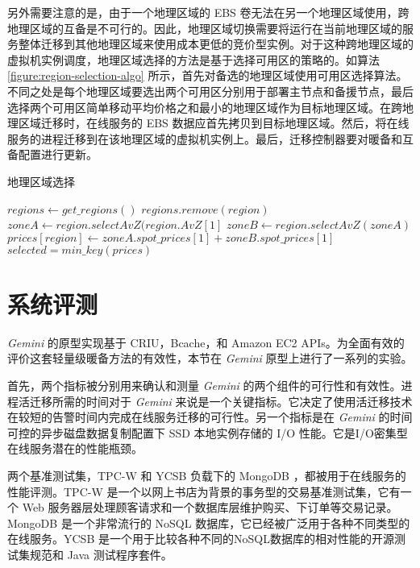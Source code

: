 另外需要注意的是，由于一个地理区域的 EBS 卷无法在另一个地理区域使用，跨地理区域的互备是不可行的。因此，地理区域切换需要将运行在当前地理区域的服务整体迁移到其他地理区域来使用成本更低的竞价型实例。对于这种跨地理区域的虚拟机实例调度，地理区域选择的方法是基于选择可用区的策略的。如算法 \ref{figure:region-selection-algo} 所示，首先对备选的地理区域使用可用区选择算法。不同之处是每个地理区域要选出两个可用区分别用于部署主节点和备援节点，最后选择两个可用区简单移动平均价格之和最小的地理区域作为目标地理区域。在跨地理区域迁移时，在线服务的 EBS 数据应首先拷贝到目标地理区域。然后，将在线服务的进程迁移到在该地理区域的虚拟机实例上。最后，迁移控制器要对暖备和互备配置进行更新。

\begin{algorithm}
\caption{地理区域选择}
\label{figure:region-selection-algo}

$regions\gets get\_regions()$
{
  {
    $regions.remove(region)$\;
  }
}
{
  $zoneA\gets region.selectAvZ(region.AvZ[1]$
  $zoneB\gets region.selectAvZ(zoneA)$
  $prices[region]\gets zoneA.spot\_prices[1] + zoneB.spot\_prices[1]$\;
}
$selected = min\_key(prices)$\;
\end{algorithm}

\section{系统评测}
\emph{Gemini} 的原型实现基于 CRIU，Bcache，和 Amazon EC2 APIs。为全面有效的评价这套轻量级暖备方法的有效性，本节在 \emph{Gemini} 原型上进行了一系列的实验。

首先，两个指标被分别用来确认和测量 \emph{Gemini} 的两个组件的可行性和有效性。进程活迁移所需的时间对于 \emph{Gemini} 来说是一个关键指标。它决定了使用活迁移技术在较短的告警时间内完成在线服务迁移的可行性。另一个指标是在 \emph{Gemini} 的时间可控的异步磁盘数据复制配置下 SSD 本地实例存储的 I/O 性能。它是I/O密集型在线服务潜在的性能瓶颈。

两个基准测试集，TPC-W \cite{TPCW:2014} 和 YCSB \cite{YCSB:2014} 负载下的 MongoDB \cite{Mongodb:2014}，都被用于在线服务的性能评测。TPC-W 是一个以网上书店为背景的事务型的交易基准测试集，它有一个 Web 服务器层处理顾客请求和一个数据库层维护购买、下订单等交易记录。MongoDB 是一个非常流行的 NoSQL 数据库，它已经被广泛用于各种不同类型的在线服务。YCSB 是一个用于比较各种不同的NoSQL数据库的相对性能的开源测试集规范和 Java 测试程序套件。

